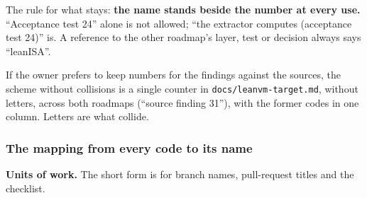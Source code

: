 The rule for what stays: \textbf{the name stands beside the number at every use.} ``Acceptance test 24'' alone is not allowed; ``the extractor computes (acceptance test 24)'' is. A reference to the other roadmap's layer, test or decision always says ``leanISA''.

\begin{sloppypar}
If the owner prefers to keep numbers for the findings against the sources, the scheme without collisions is a single counter in \texttt{docs/\allowbreak{}leanvm-\allowbreak{}target.\allowbreak{}md}, without letters, across both roadmaps (``source finding 31''), with the former codes in one column. Letters are what collide.
\end{sloppypar}

\subsubsection{The mapping from every code to its name}\label{sec:docs-codes-mapping}

\textbf{Units of work.} The short form is for branch names, pull-request titles and the checklist.

